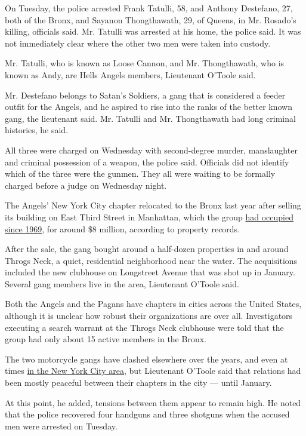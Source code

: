 On Tuesday, the police arrested Frank Tatulli, 58, and Anthony
Destefano, 27, both of the Bronx, and Sayanon Thongthawath, 29, of
Queens, in Mr. Rosado's killing, officials said. Mr. Tatulli was
arrested at his home, the police said. It was not immediately clear
where the other two men were taken into custody.

Mr. Tatulli, who is known as Loose Cannon, and Mr. Thongthawath, who is
known as Andy, are Hells Angels members, Lieutenant O'Toole said.

Mr. Destefano belongs to Satan's Soldiers, a gang that is considered a
feeder outfit for the Angels, and he aspired to rise into the ranks of
the better known gang, the lieutenant said. Mr. Tatulli and Mr.
Thongthawath had long criminal histories, he said.

All three were charged on Wednesday with second-degree murder,
manslaughter and criminal possession of a weapon, the police said.
Officials did not identify which of the three were the gunmen. They all
were waiting to be formally charged before a judge on Wednesday night.

The Angels' New York City chapter relocated to the Bronx last year after
selling its building on East Third Street in Manhattan, which the group
\href{https://www.nytimes3xbfgragh.onion/2007/02/01/nyregion/01angels.html}{had
occupied since 1969}, for around \$8 million, according to property
records.

After the sale, the gang bought around a half-dozen properties in and
around Throgs Neck, a quiet, residential neighborhood near the water.
The acquisitions included the new clubhouse on Longstreet Avenue that
was shot up in January. Several gang members live in the area,
Lieutenant O'Toole said.

Both the Angels and the Pagans have chapters in cities across the United
States, although it is unclear how robust their organizations are over
all. Investigators executing a search warrant at the Throgs Neck
clubhouse were told that the group had only about 15 active members in
the Bronx.

The two motorcycle gangs have clashed elsewhere over the years, and even
at times
\href{https://www.nytimes3xbfgragh.onion/2002/05/29/nyregion/bikers-take-plea-deal-in-fight-with-hells-angels.html}{in
the New York City area}, but Lieutenant O'Toole said that relations had
been mostly peaceful between their chapters in the city --- until
January.

At this point, he added, tensions between them appear to remain high. He
noted that the police recovered four handguns and three shotguns when
the accused men were arrested on Tuesday.


